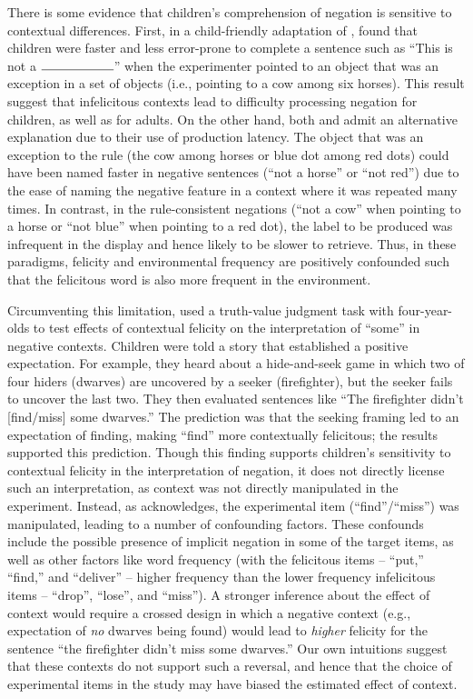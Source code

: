 \documentclass[man, noapacite]{apa2}
\begin{document}
There is some evidence that children's comprehension of negation is sensitive to contextual differences. First, in a child-friendly adaptation of ,  found that children were faster and less error-prone to complete a sentence such as ``This is not a $\rule{2cm}{0.15mm}$'' when the experimenter pointed to an object that was an exception in a set of objects (i.e., pointing to a cow among six horses). This result suggest that infelicitous contexts lead to difficulty processing negation for  children, as well as for adults. On the other hand, both  and  admit an alternative explanation due to their use of production latency. The object that was an exception to the rule (the cow among horses or blue dot among red dots) could have been named faster in negative sentences (``not a horse'' or ``not red'') due to the ease of naming the negative feature in a context where it was repeated many times. In contrast, in the rule-consistent negations (``not a cow'' when pointing to a horse or ``not blue'' when pointing to a red dot), the label to be produced was infrequent in the display and hence likely to be slower to retrieve. Thus, in these paradigms, felicity and environmental frequency are positively confounded such that the felicitous word is also more frequent in the environment.

Circumventing this limitation,  used a truth-value judgment task with four-year-olds to test effects of contextual felicity on the interpretation of ``some'' in negative contexts. Children were told a story that established a positive expectation. For example, they heard about a hide-and-seek game in which two of four hiders (dwarves) are uncovered by a seeker (firefighter), but the seeker fails to uncover the last two. They then evaluated sentences like ``The firefighter didn't [find/miss] some dwarves.'' The prediction was that the seeking framing led to an expectation of finding, making ``find'' more contextually felicitous; the results supported this prediction. Though this finding supports children's sensitivity to contextual felicity in the interpretation of negation, it does not directly license such an interpretation, as context was not directly manipulated in the experiment. Instead, as  acknowledges, the experimental item (``find''/``miss'') was manipulated, leading to a number of confounding factors. These confounds include the possible presence of implicit negation in some of the target items, as well as other factors like word frequency (with the felicitous items -- ``put,'' ``find,'' and ``deliver'' -- higher frequency than the lower frequency infelicitous items -- ``drop'', ``lose'', and ``miss''). A stronger inference about the effect of context would require a crossed design in which a negative context (e.g., expectation of \emph{no} dwarves being found) would lead to \emph{higher} felicity for the sentence ``the firefighter didn't miss some dwarves.'' Our own intuitions suggest that these contexts do not support such a reversal, and hence that the choice of experimental items in the study may have biased the estimated effect of context.
\end{document}
